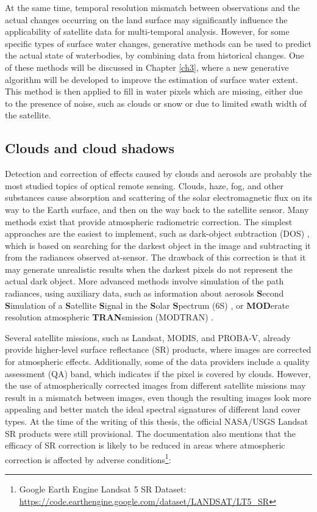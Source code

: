 At the same time, temporal resolution mismatch between observations and the actual changes occurring on the land surface may significantly influence the applicability of satellite data for multi-temporal analysis. However, for some specific types of surface water changes, generative methods can be used to predict the actual state of waterbodies, by combining data from historical changes. One of these methods will be discussed in Chapter \ref{ch3}, where a new generative algorithm will be developed to improve the estimation of surface water extent. This method is then applied to fill in water pixels which are missing, either due to the presence of noise, such as clouds or snow or due to limited swath width of the satellite.

\subsection{Clouds and cloud shadows}

Detection and correction of effects caused by clouds and aerosols are probably the most studied topics of optical remote sensing. Clouds, haze, fog, and other substances cause absorption and scattering of the solar electromagnetic flux on its way to the Earth surface, and then on the way back to the satellite sensor. Many methods exist that provide atmospheric radiometric correction. The simplest approaches are the easiest to implement, such as dark-object subtraction (DOS) \citet{chavez1996image}, which is based on searching for the darkest object in the image and subtracting it from the radiances observed at-sensor. The drawback of this correction is that it may generate unrealistic results when the darkest pixels do not represent the actual dark object. More advanced methods involve simulation of the path radiances, using auxiliary data, such as information about aerosols \textbf{S}econd \textbf{S}imulation of a \textbf{S}atellite \textbf{S}ignal in the \textbf{S}olar \textbf{S}pectrum (6S) \citet{vermote1997second}, \citet{zhang2012improved} or \textbf{MOD}erate resolution atmospheric \textbf{TRAN}smission (MODTRAN) \citet{berk1987modtran}. 

Several satellite missions, such as Landsat, MODIS, and PROBA-V, already provide higher-level surface reflectance (SR) products, where images are corrected for atmospheric effects. Additionally, some of the data providers include a quality assessment (QA) band, which indicates if the pixel is covered by clouds. However, the use of atmospherically corrected images from different satellite missions may result in a mismatch between images, even though the resulting images look more appealing and better match the ideal spectral signatures of different land cover types. At the time of the writing of this thesis, the official NASA/USGS Landsat SR products were still provisional. The documentation also mentions that the efficacy of SR correction is likely to be reduced in areas where atmospheric correction is affected by adverse conditions\footnote{Google Earth Engine Landsat 5 SR Dataset: \url{https://code.earthengine.google.com/dataset/LANDSAT/LT5\_SR}}:

